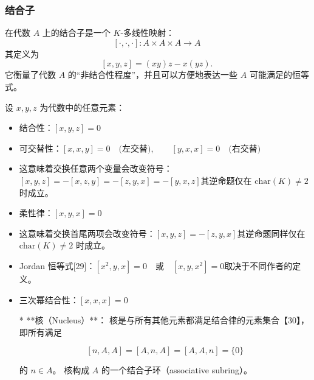 \subsubsection{结合子}
在代数 $A$ 上的结合子是一个 $K$-多线性映射：
$$
[\cdot,\cdot,\cdot] : A \times A \times A \to A~
$$
其定义为
$$
[x,y,z] = (xy)z - x(yz).~
$$
它衡量了代数 $A$ 的“非结合性程度”，并且可以方便地表达一些 $A$ 可能满足的恒等式。

设 $x, y, z$ 为代数中的任意元素：

\begin{itemize}
\item 结合性：$[x,y,z] = 0$
\item 可交替性：$[x,x,y] = 0 \quad \text{(左交替)}, \qquad [y,x,x] = 0 \quad \text{(右交替)}$
\item 这意味着交换任意两个变量会改变符号：$[x,y,z] = -[x,z,y] = -[z,y,x] = -[y,x,z]$其逆命题仅在 $\mathrm{char}(K) \neq 2$ 时成立。
\item 柔性律：$[x,y,x] = 0$
\item 这意味着交换首尾两项会改变符号：$[x,y,z] = -[z,y,x]$其逆命题同样仅在 $\mathrm{char}(K) \neq 2$ 时成立。
\item Jordan 恒等式[29]：$[x^2,y,x] = 0 \quad \text{或} \quad [x,y,x^2] = 0$取决于不同作者的定义。
\item 三次幂结合性：$[x,x,x] = 0$

* **核（Nucleus）**：
  核是与所有其他元素都满足结合律的元素集合【30】，即所有满足

  $$
  [n,A,A] = [A,n,A] = [A,A,n] = \{0\}
  $$

  的 $n \in A$。
  核构成 $A$ 的一个结合子环（associative subring）。
\end{itemize}

